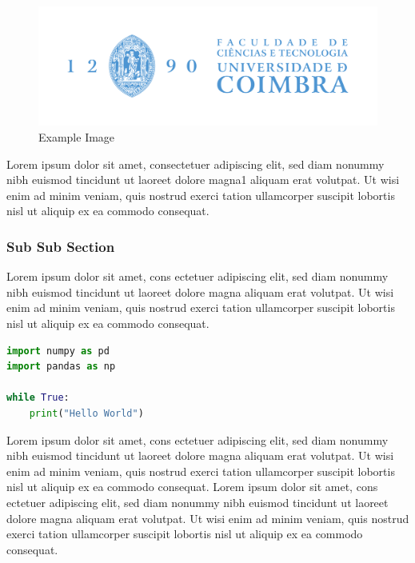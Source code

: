 \begin{figure}[H]
    \centering
    \includegraphics[width=0.5\linewidth]{images/UC_logos/FCTUC_V_FundoClaro.png}
    \caption{Example Image \cite{ExampleArticle}}
    \label{fig: sample image}
\end{figure}

Lorem ipsum dolor sit amet, consectetuer adipiscing elit, sed diam nonummy nibh euismod tincidunt ut laoreet dolore magna1 aliquam erat volutpat. Ut wisi enim ad minim veniam, quis nostrud exerci tation ullamcorper suscipit lobortis nisl ut aliquip ex ea commodo consequat.


\subsubsection{Sub Sub Section}

Lorem ipsum dolor sit amet, cons ectetuer adipiscing elit, sed diam nonummy nibh euismod tincidunt ut laoreet dolore magna aliquam erat volutpat. Ut wisi enim ad minim veniam, quis nostrud exerci tation ullamcorper suscipit lobortis nisl ut aliquip ex ea commodo consequat.


\begin{lstlisting}[language=Python, caption= Sample code listing, label=lst: sample code,frame=tb]
import numpy as pd 
import pandas as np

while True:
    print("Hello World")
\end{lstlisting}

Lorem ipsum dolor sit amet, cons ectetuer adipiscing elit, sed diam nonummy nibh euismod tincidunt ut laoreet dolore magna aliquam erat volutpat. Ut wisi enim ad minim veniam, quis nostrud exerci tation ullamcorper suscipit lobortis nisl ut aliquip ex ea commodo consequat.
Lorem ipsum dolor sit amet, cons ectetuer adipiscing elit, sed diam nonummy nibh euismod tincidunt ut laoreet dolore magna aliquam erat volutpat. Ut wisi enim ad minim veniam, quis nostrud exerci tation ullamcorper suscipit lobortis nisl ut aliquip ex ea commodo consequat.